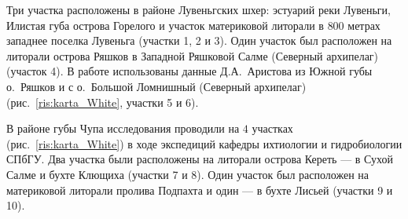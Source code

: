 Три участка расположены в районе Лувеньгских шхер: эстуарий реки Лувеньги, Илистая губа острова Горелого и участок материковой литорали в $800$ метрах западнее поселка Лувеньга (участки 1, 2 и 3).
Один участок был расположен на литорали острова Ряшков в Западной Ряшковой Салме (Северный архипелаг) (участок 4).
В работе использованы данные Д.\:А.~Аристова из Южной губы о.~Ряшков и с о.~Большой Ломнишный (Северный архипелаг) (рис.~\ref{ris:karta_White}, участки 5 и 6). 

В районе губы Чупа исследования проводили на $4$ участках (рис.~\ref{ris:karta_White}) в ходе экспедиций кафедры ихтиологии и гидробиологии СПбГУ. 
Два участка были расположены на литорали острова Кереть --- в Сухой Салме и бухте Клющиха (участки 7 и 8). 
Один участок был расположен на материковой литорали пролива Подпахта и один --- в бухте Лисьей (участки 9 и 10).


\afterpage{\clearpage}

